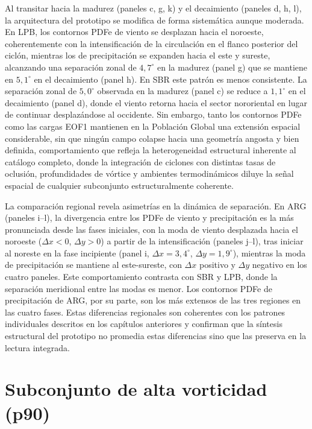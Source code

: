 Al transitar hacia la madurez (paneles c, g, k) y el decaimiento (paneles d, h, l), la arquitectura del prototipo se modifica de forma sistemática aunque moderada. En LPB, los contornos PDFe de viento se desplazan hacia el noroeste, coherentemente con la intensificación de la circulación en el flanco posterior del ciclón, mientras los de precipitación se expanden hacia el este y sureste, alcanzando una separación zonal de $4{,}7^{\circ}$ en la madurez (panel g) que se mantiene en $5{,}1^{\circ}$ en el decaimiento (panel h). En SBR este patrón es menos consistente. La separación zonal de $5{,}0^{\circ}$ observada en la madurez (panel c) se reduce a $1{,}1^{\circ}$ en el decaimiento (panel d), donde el viento retorna hacia el sector nororiental en lugar de continuar desplazándose al occidente. Sin embargo, tanto los contornos PDFe como las cargas EOF1 mantienen en la Población Global una extensión espacial considerable, sin que ningún campo colapse hacia una geometría angosta y bien definida, comportamiento que refleja la heterogeneidad estructural inherente al catálogo completo, donde la integración de ciclones con distintas tasas de oclusión, profundidades de vórtice y ambientes termodinámicos diluye la señal espacial de cualquier subconjunto estructuralmente coherente.

La comparación regional revela asimetrías en la dinámica de separación. En ARG (paneles i--l), la divergencia entre los PDFe de viento y precipitación es la más pronunciada desde las fases iniciales, con la moda de viento desplazada hacia el noroeste ($\Delta x < 0$, $\Delta y > 0$) a partir de la intensificación (paneles j--l), tras iniciar al noreste en la fase incipiente (panel i, $\Delta x = 3{,}4^{\circ}$, $\Delta y = 1{,}9^{\circ}$), mientras la moda de precipitación se mantiene al este-sureste, con $\Delta x$ positivo y $\Delta y$ negativo en los cuatro paneles. Este comportamiento contrasta con SBR y LPB, donde la separación meridional entre las modas es menor. Los contornos PDFe de precipitación de ARG, por su parte, son los más extensos de las tres regiones en las cuatro fases. Estas diferencias regionales son coherentes con los patrones individuales descritos en los capítulos anteriores y confirman que la síntesis estructural del prototipo no promedia estas diferencias sino que las preserva en la lectura integrada.

\section{Subconjunto de alta vorticidad (p90)}\label{sec:prototipo_p90}

